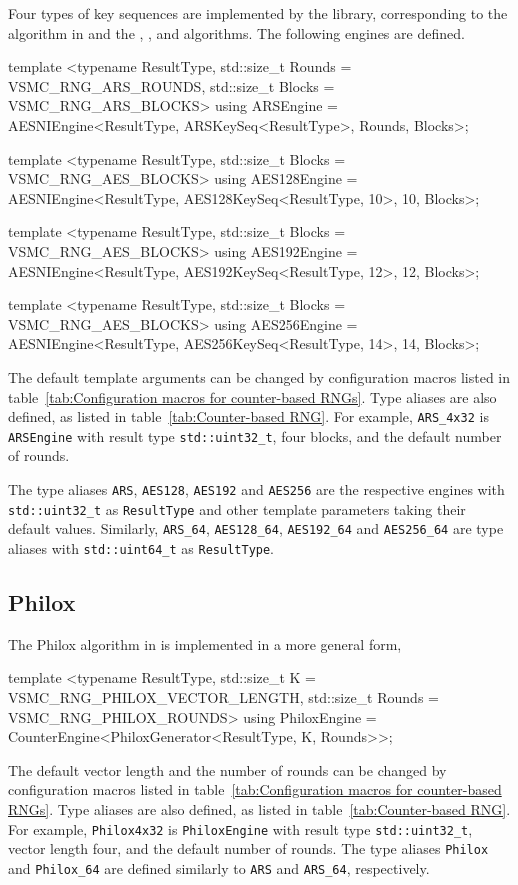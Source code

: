 Four types of key sequences are implemented by the library, corresponding to
the \ars algorithm in \textcite{Salmon:2011um} and the , , and
 algorithms. The following \rng engines are defined.
\begin{cppcode}
  template <typename ResultType, std::size_t Rounds = VSMC_RNG_ARS_ROUNDS,
      std::size_t Blocks = VSMC_RNG_ARS_BLOCKS>
  using ARSEngine =
      AESNIEngine<ResultType, ARSKeySeq<ResultType>, Rounds, Blocks>;

  template <typename ResultType, std::size_t Blocks = VSMC_RNG_AES_BLOCKS>
  using AES128Engine =
      AESNIEngine<ResultType, AES128KeySeq<ResultType, 10>, 10, Blocks>;

  template <typename ResultType, std::size_t Blocks = VSMC_RNG_AES_BLOCKS>
  using AES192Engine =
      AESNIEngine<ResultType, AES192KeySeq<ResultType, 12>, 12, Blocks>;

  template <typename ResultType, std::size_t Blocks = VSMC_RNG_AES_BLOCKS>
  using AES256Engine =
      AESNIEngine<ResultType, AES256KeySeq<ResultType, 14>, 14, Blocks>;
\end{cppcode}
The default template arguments can be changed by configuration macros listed in
table~\ref{tab:Configuration macros for counter-based RNGs}. Type aliases are
also defined, as listed in table~\ref{tab:Counter-based RNG}. For example,
\verb|ARS_4x32| is \verb|ARSEngine| with result type \verb|std::uint32_t|, four
blocks, and the default number of rounds.

The type aliases \verb|ARS|, \verb|AES128|, \verb|AES192| and \verb|AES256| are
the respective engines with \verb|std::uint32_t| as \verb|ResultType| and other
template parameters taking their default values. Similarly, \verb|ARS_64|,
\verb|AES128_64|, \verb|AES192_64| and \verb|AES256_64| are type aliases with
\verb|std::uint64_t| as \verb|ResultType|.

\subsection{Philox}
\label{sub:Philox}

The Philox algorithm in \textcite{Salmon:2011um} is implemented in a more
general form,
\begin{cppcode}
  template <typename ResultType, std::size_t K = VSMC_RNG_PHILOX_VECTOR_LENGTH,
      std::size_t Rounds = VSMC_RNG_PHILOX_ROUNDS>
  using PhiloxEngine = CounterEngine<PhiloxGenerator<ResultType, K, Rounds>>;
\end{cppcode}
The default vector length and the number of rounds can be changed by
configuration macros listed in table~\ref{tab:Configuration macros for
  counter-based RNGs}. Type aliases are also defined, as listed in
table~\ref{tab:Counter-based RNG}. For example, \verb|Philox4x32| is
\verb|PhiloxEngine| with result type \verb|std::uint32_t|, vector length four,
and the default number of rounds. The type aliases \verb|Philox| and
\verb|Philox_64| are defined similarly to \verb|ARS| and \verb|ARS_64|,
respectively.

